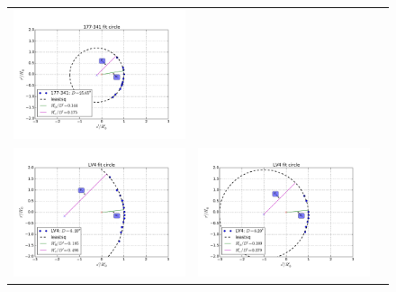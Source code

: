 \begin{figure}
\begin{tabular}{@{}c@{}c@{}c@{}}
  \includegraphics[clip]{../../read-shapes/Multi-Fit/samp01/LV-bowshocks-xyfancy-positionssamp01-177-341} \\
  \includegraphics[clip]{../../read-shapes/LV-bowshocks-xyfancy-positionswill-LV4} & \includegraphics[clip]{../../read-shapes/Multi-Fit/samp05/LV-bowshocks-xyfancy-positionssamp05-LV4} &

\end{tabular}
\end{figure}
